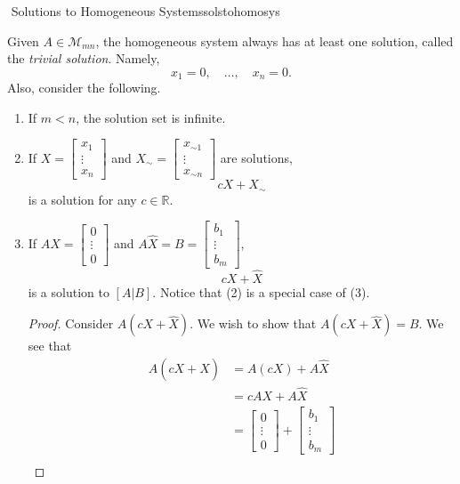     \begin{theorem}{\Stop\,\,Solutions to Homogeneous Systems}{solstohomosys}
    
        Given \(A\in\mathcal{M}_{mn}\), the homogeneous system always has at least one solution, called the \textit{trivial solution}. Namely,
        \begin{equation*}
            x_1=0,\quad\ldots,\quad x_n=0.
        \end{equation*}
        Also, consider the following.
        \begin{enumerate}
            \item If \(m<n\), the solution set is infinite. 
            \item If \(X=\begin{bmatrix} x_1 \\ \vdots \\ x_n \end{bmatrix}\) and \(X_\sim=\begin{bmatrix} x_{\sim 1} \\ \vdots \\ x_{\sim n} \end{bmatrix}\) are solutions,
            \begin{equation*}
                cX+X_\sim
            \end{equation*}
            is a solution for any \(c\in\mathbb{R}\).
            \item If \(AX=\begin{bmatrix} 0 \\ \vdots \\ 0 \end{bmatrix}\) and \(A\hat{X}=B=\begin{bmatrix} b_1 \\ \vdots \\ b_m \end{bmatrix}\),
            \begin{equation*}
                cX+\hat{X}
            \end{equation*}
            is a solution to \([A|B]\). Notice that (2) is a special case of (3).
            \begin{proof}
                Consider \(A(cX+\hat{X})\). We wish to show that \(A(cX+\hat{X})=B\). We see that
                \begin{align*}
                    A(cX+\hat{X})&=A(cX)+A\hat{X} \\
                    &=cAX+A\hat{X} \\
                    &=\begin{bmatrix} 0 \\ \vdots \\ 0 \end{bmatrix}+\begin{bmatrix} b_1 \\ \vdots \\ b_m \end{bmatrix} \\

\end{align*}
\end{proof}
\end{enumerate}
\end{theorem}
